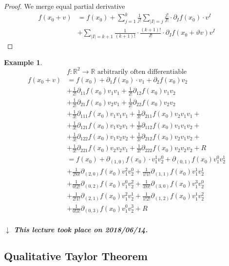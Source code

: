 \documentclass{article}
\newtheorem{example}{Example}  \numberwithin{example}{section}
\newcommand{\card}[1]{\left|#1\right|}
\newcommand{\dateref}[1]{%
  \begin{mdframed}[backgroundcolor=gray!10,innerbottommargin=0pt,innertopmargin=0pt]
    \paragraph{\textit{$\downarrow$ This lecture took place on #1.}}%
  \end{mdframed}%
}
\begin{document}
\begin{proof}
  We merge equal partial derivative
  \begin{align*}
    f(x_0 + v) &= f(x_0) + \sum_{j=1}^k \frac{1}{j!} \sum_{\card{I}=j}  \frac{j!}{I!} \cdot \partial_I f(x_0) \cdot v^I \\
      &+ \sum_{\card{I} = k+1} \frac{1}{(k+1)!} \cdot \frac{(k+1)!}{I!} \cdot \partial_I f(x_0 + \vartheta v) v^I
  \end{align*}
\end{proof}

\begin{example}
  \[ f: \mathbb R^2 \to \mathbb R \text{ arbitrarily often differentiable} \]
  \begin{align*}
    f(x_0 + v) &= f(x_0) + \partial_1 f(x_0) \cdot v_1 + \partial_2 f(x_0) v_2 \\
      &+ \frac1{2!} \partial_{11} f(x_0) v_1 v_1 + \frac{1}{2!} \partial_{12} f(x_0) v_1 v_2 \\
      &+ \frac{1}{2!} \partial_{21} f(x_0) v_2 v_1 + \frac{1}{2!} \partial_{22} f(x_0) v_2 v_2 \\
      &+ \frac{1}{3!} \partial_{111} f(x_0) v_1 v_1 v_1 + \frac{1}{3!} \partial_{211} f(x_0) v_2 v_1 v_1 + \\
      &+ \frac{1}{3!} \partial_{121} f(x_0) v_1 v_2 v_1 + \frac{1}{3!} \partial_{112} f(x_0) v_1 v_1 v_2 + \\
      &+ \frac{1}{3!} \partial_{122} f(x_0) v_1 v_2 v_2 + \frac{1}{3!} \partial_{212} f(x_0) v_2 v_1 v_2 + \\
      &+ \frac{1}{3!} \partial_{221} f(x_0) v_2 v_2 v_1 + \frac{1}{3!} \partial_{222} f(x_0) v_2 v_2 v_2 + R \\
      &= f(x_0) + \partial_{(1,0)} f(x_0) \cdot v_1^1 v_2^0 + \partial_{(0,1)} f(x_0) v_1^0 v_2^1 \\
      &+ \frac{1}{2! 0!} \partial_{(2,0)} f(x_0) v_1^2 v_2^0 + \frac{1}{1! 1!} \partial_{(1,1)} f(x_0) v_1^1 v_2^1 \\
      &+ \frac{1}{0! 2!} \partial_{(0,2)} f(x_0) v_1^0 v_2^2 + \frac{1}{3! 0!} \partial_{(3,0)} f(x_0) v_1^3 v_2^0 \\
      &+ \frac{1}{2! 1!} \partial_{(2,1)} f(x_0) v_1^2 v_2^1 + \frac{1}{1! 2!} \partial_{(1,2)} f(x_0) v_1^1 v_2^2 \\
      &+ \frac{1}{0! 3!} \partial_{(0,3)} f(x_0) v_1^0 v_2^3 + R
  \end{align*}
\end{example}

\dateref{2018/06/14}

\subsection{Qualitative Taylor Theorem}
\end{document}
